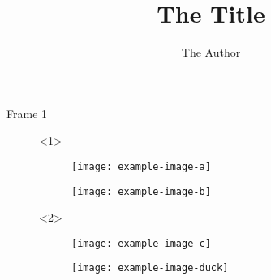 \documentclass{beamer}
\title{The Title}
\author{The Author}
\begin{document}
                                                                                                                           

\begin{frame}{Frame 1}
  \begin{figure}
    \begin{onlyenv}<1>
        \begin{subfigure}{0.45\paperwidth}
          \texttt{[image: example-image-a]}
          \caption{}
        \end{subfigure}%
        \begin{subfigure}{0.45\paperwidth}
          \texttt{[image: example-image-b]}
          \caption{}
        \end{subfigure}
    \end{onlyenv}

    \begin{onlyenv}<2>
        \begin{subfigure}{0.45\paperwidth}
          \texttt{[image: example-image-c]}
          \caption{}
        \end{subfigure}%
        \begin{subfigure}{0.45\paperwidth}
          \texttt{[image: example-image-duck]}
          \caption{}
        \end{subfigure}
      \end{onlyenv}
    \caption{}
  \end{figure}
\end{frame}                                                                                                                                   
\end{document}
